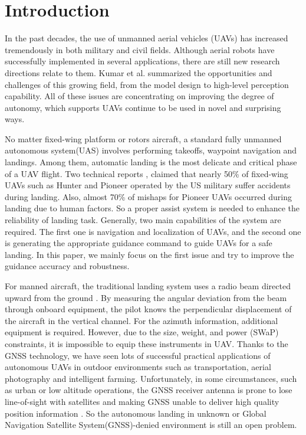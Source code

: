 \section{Introduction}
\label{intro}
In the past decades, the use of unmanned aerial vehicles (UAVs) has increased tremendously in both military and civil fields. Although aerial robots have successfully implemented in several applications, there are still new research directions relate to them. Kumar et al. \cite{kumar2012opportunities} summarized the opportunities and challenges of this growing field, from the model design to high-level perception capability. All of these issues are concentrating on improving the degree of autonomy, which supports UAVs continue to be used in novel and surprising ways.

No matter fixed-wing platform or rotors aircraft, a standard fully unmanned autonomous system(UAS) involves performing takeoffs, waypoint navigation and landings. Among them, automatic landing is the most delicate and critical phase of a UAV flight. Two technical reports \cite{williams2004summary,manning2004role}, claimed that nearly 50\% of fixed-wing UAVs such as Hunter and Pioneer operated by the US military suffer accidents during landing. Also, almost 70\% of mishaps for Pioneer UAVs occurred during landing due to human factors. So a proper assist system is needed to enhance the reliability of landing task. Generally, two main capabilities of the system are required. The first one is navigation and localization of UAVs, and the second one is generating the appropriate guidance command to guide UAVs for a safe landing. In this paper, we mainly focus on the first issue and try to improve the guidance accuracy and robustness.


For manned aircraft, the traditional landing system uses a radio beam directed upward from the ground \cite{mclean1990automatic, stevens2003aircraft}. By measuring the angular deviation from the beam through onboard equipment, the pilot knows the perpendicular displacement of the aircraft in the vertical channel. For the azimuth information, additional equipment is required. However, due to the size, weight, and power (SWaP) constraints, it is impossible to equip these instruments in UAV. Thanks to the GNSS technology, we have seen lots of successful practical applications of autonomous UAVs in outdoor environments such as transportation, aerial photography and intelligent farming. Unfortunately, in some circumstances, such as urban or low altitude operations, the GNSS receiver antenna is prone to lose line-of-sight with satellites and making GNSS unable to deliver high quality position information \cite{farrell1998gps}. So the autonomous landing in unknown or Global Navigation Satellite System(GNSS)-denied environment is still an open problem. 

